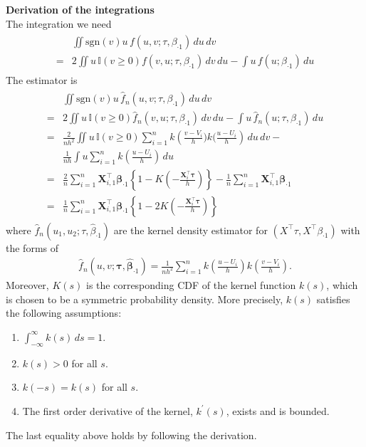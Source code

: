 \documentclass[14pt]{extreport}
\begin{document}
\textbf{Derivation of the integrations}\\
The integration we need
\begin{gather*}
\begin{flalign*}
 & \iint \text{sgn}\left( v \right) u \,f\left( u,v ;\tau, \beta_{\cdot1} \right) \,du\,dv \\
= & 2\iint u\,\mathbb{I}\left(v\ge0\right)f\left(v,u;\tau,\beta_{\cdot1}\right)\,dv\,du-\int u\,f\left(u;\beta_{\cdot1}\right)\,du
\end{flalign*}
\end{gather*}
The estimator is
\begin{gather*}
\begin{flalign*}
& \iint \text{sgn}\left( v \right) u \,\widehat{f}_n\left( u,v ;\tau, \beta_{\cdot1} \right) \,du\,dv \\
= & 2\iint u\,\mathbb{I}\left(v\ge0\right)\widehat{f}_n\left(v,u;\tau,\beta_{\cdot1}\right)\,dv\,du-\int u\,\widehat{f}_n\left(u;\tau, \beta_{\cdot1}\right)\,du \\
=  & \frac{2}{nh^2}\iint u\,\mathbb{I}\left(v\ge0\right)\sum_{i=1}^{n}k\left(\frac{v-V_{i}}{h}\bigg)k\bigg(\frac{u-U_i}{h}\right)\,du\,dv-\\
&\frac{1}{nh}\int u\sum_{i=1}^{n}k\left(\frac{u-U_{i}}{h}\right)\,du\\
= & \frac{2}{n}\sum_{i=1}^{n}\boldsymbol{X}_{i,1}^{\intercal}\boldsymbol{\beta}_{\cdot1}\left\{ 1-K\left(-\frac{\boldsymbol{X}_{i}^{\intercal}\boldsymbol{\tau}}{h}\right)\right\} -\frac{1}{n}\sum_{i=1}^{n}\boldsymbol{X}_{i,1}^{\intercal}\boldsymbol{\beta}_{\cdot1}\\
=& \frac{1}{n}\sum_{i=1}^{n}\boldsymbol{X}_{i,1}^{\intercal}\boldsymbol{\beta}_{\cdot1}\left\{ 1-2K\left(-\frac{\boldsymbol{X}_{i}^{\intercal}\boldsymbol{\tau}}{h}\right)\right\}
\end{flalign*}
\end{gather*}
where $\widehat{f}_n(u_{1},u_{2};\tau,\widehat{\beta}_{\cdot1})$
are the kernel density estimator for $\left(X^{\intercal}\tau, X^{\intercal}\beta_{\cdot1}\right)$
with the forms of 
\begin{gather*}
\widehat{f}_n(u,v;\boldsymbol{\tau},\widehat{\boldsymbol{\beta}}_{\cdot1})=\frac{1}{nh^2}\sum_{i=1}^{n}k\left(\frac{u-U_{i}}{h}\right)k\left(\frac{v-V_{i}}{h}\right).
\end{gather*}
Moreover, $K(s)$ is the corresponding CDF of the kernel function $k(s)$, which is chosen to be a symmetric probability density. More precisely, $k(s)$ satisfies the following assumptions:
\begin{enumerate}
	\item $\int_{-\infty}^{\infty}k(s)\,ds=1.$
	\item $k(s)>0$ for all $s$.
	\item $k(-s)=k(s)$ for all $s$. 
	\item The first order derivative of the kernel, $k^{\prime}(s)$,
	exists and is bounded. 
\end{enumerate}
The last equality above holds by following the derivation.\\
\end{document}
